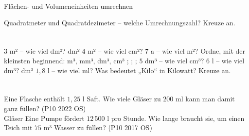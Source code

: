 \setcounter{aufgabe}{28}

\begin{aufgabe}{Flächen- und Volumeneinheiten umrechnen}
\begin{teile}
\teil Quadratmeter und Quadratdezimeter – welche Umrechnungszahl? Kreuze an.\\ \\ \\ 
\teil $3$ m² – wie viel dm²? \leerfeld dm²
\teil $4$ m² – wie viel cm²? \leerfeld[cm²]
\teil $7$ a – wie viel m²? \leerfeld[m²]
\teil Ordne, mit der kleinsten beginnend: m³, mm³, dm³, cm³ \leerfeld ; \leerfeld ; \leerfeld ; \leerfeld
\teil $5$ dm³ – wie viel cm³? \leerfeld[cm³]
\teil $6$ l – wie viel dm³? \leerfeld dm³
\teil $1{,}8$ l – wie viel ml? \leerfeld[ml]
\teil Was bedeutet „Kilo“ in Kilowatt? Kreuze an.\\ \\ \\ 
\teil Eine Flasche enthält $1{,}25$ l Saft. Wie viele Gläser zu $200$ ml kann man damit ganz füllen? \hfill (P10 2022 OS) \\ \leerfeld Gläser
\teil Eine Pumpe fördert $12\,500$ l pro Stunde. Wie lange braucht sie, um einen Teich mit $75$ m³ Wasser zu füllen? \hfill (P10 2017 OS) \\ \leerfeld[h]
\end{teile}
\end{aufgabe}

